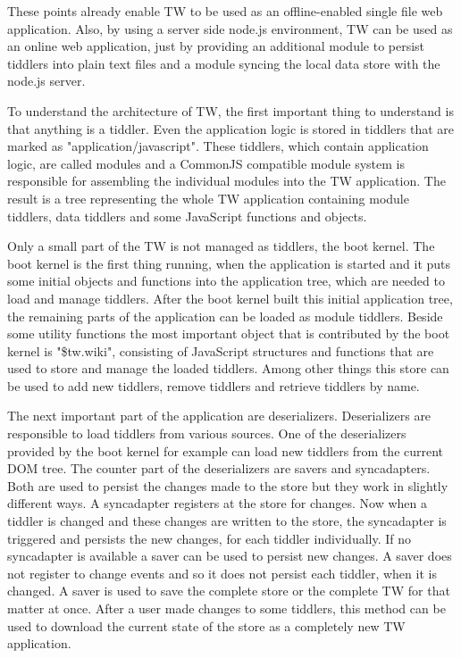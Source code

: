 \documentclass[12pt,a4paper]{article}
\newcommand{\todo}[1]{{\bf TODO: #1}\\
}
\begin{document}
These points already enable TW to be used as an offline-enabled single file web application.
Also, by using a server side node.js environment, TW can be used as an online web application, just by providing an additional module to persist tiddlers into plain text files and a module syncing the local data store with the node.js server.

To understand the architecture of TW, the first important thing to understand is that anything is a tiddler.
Even the application logic is stored in tiddlers that are marked as "application/javascript".
These tiddlers, which contain application logic, are called modules and a CommonJS compatible module system is responsible for assembling the individual modules into the TW application.
The result is a tree representing the whole TW application containing module tiddlers, data tiddlers and some JavaScript functions and objects.

Only a small part of the TW is not managed as tiddlers, the boot kernel.
The boot kernel is the first thing running, when the application is started and it puts some initial objects and functions into the application tree, which are needed to load and manage tiddlers.
After the boot kernel built this initial application tree, the remaining parts of the application can be loaded as module tiddlers.
Beside some utility functions the most important object that is contributed by the boot kernel is "\$tw.wiki", consisting of JavaScript structures and functions that are used to store and manage the loaded tiddlers.
Among other things this store can be used to add new tiddlers, remove tiddlers and retrieve tiddlers by name.

The next important part of the application are deserializers. Deserializers are responsible to load tiddlers from various sources. One of the deserializers provided by the boot kernel for example can load new tiddlers from the current DOM tree.
The counter part of the deserializers are savers and syncadapters.
Both are used to persist the changes made to the store but they work in slightly different ways.
A syncadapter registers at the store for changes.
Now when a tiddler is changed and these changes are written to the store, the syncadapter is triggered and persists the new changes, for each tiddler individually.
If no syncadapter is available a saver can be used to persist new changes.
A saver does not register to change events and so it does not persist each tiddler, when it is changed.
A saver is used to save the complete store or the complete TW for that matter at once. After a user made changes to some tiddlers, this method can be used to download the current state of the store as a completely new TW application.
\end{document}
